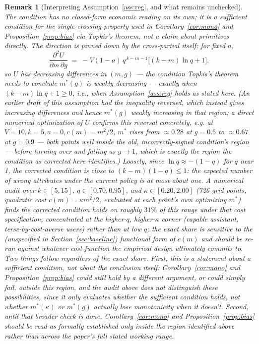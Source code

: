 \documentclass[11pt]{article}
\newtheorem{remark}{Remark}
\begin{document}
\begin{remark}[Interpreting Assumption~\ref{ass:reg}, and what remains unchecked]
\label{rmk:assumption1-audit}
The condition has no closed-form economic reading on its own; it is a sufficient
condition for the single-crossing property used in Corollary~\ref{cor:mono} and
Proposition~\ref{prop:bias} via Topkis's theorem, not a claim about primitives
directly. The direction is pinned down by the cross-partial itself: for fixed $a$,
\[
\frac{\partial^2 U}{\partial m\,\partial g} \;=\; -V(1-a)\,q^{\,k-m-1}\Big[(k-m)\ln q + 1\Big],
\]
so $U$ has \emph{decreasing differences} in $(m,g)$ --- the condition Topkis's
theorem needs to conclude $m^*(g)$ is weakly decreasing --- exactly when
$(k-m)\ln q + 1 \ge 0$, i.e., when Assumption~\ref{ass:reg} holds as stated here.
(An earlier draft of this assumption had the inequality reversed, which instead
gives \emph{increasing} differences and hence $m^*(g)$ weakly \emph{increasing}
in that region; a direct numerical optimization of $U$ confirms this reversal
concretely, e.g. at $V{=}10,k{=}5,a{=}0,c(m){=}m^2/2$, $m^*$ rises from
$\approx0.28$ at $g{=}0.5$ to $\approx0.67$ at $g{=}0.9$ --- both points well
inside the old, incorrectly-signed condition's region --- before turning over and
falling as $g\to1$, which is exactly the region the condition as corrected here
identifies.) Loosely, since $\ln q \approx -(1-q)$ for $q$ near 1, the corrected
condition is close to $(k-m)(1-q) \le 1$: the expected number of \emph{wrong}
attributes under the current policy is at most about one. A numerical audit over
$k\in[5,15]$, $q\in[0.70,0.95]$, and $\kappa\in[0.20,2.00]$ (726 grid points,
quadratic cost $c(m)=\kappa m^2/2$, evaluated at each point's own optimizing
$m^*$) finds the corrected condition holds on roughly $31\%$ of this range under
that cost specification, concentrated at the higher-$q$, higher-$\kappa$ corner
(capable assistant, terse-by-cost-averse users) rather than at low $q$; the exact
share is sensitive to the (unspecified in Section~\ref{sec:baseline}) functional
form of $c(m)$ and should be re-run against whatever cost function the empirical
design ultimately commits to. Two things follow regardless of the exact share.
First, this is a statement about a \emph{sufficient} condition, not about the
conclusion itself: Corollary~\ref{cor:mono} and Proposition~\ref{prop:bias} could
still hold by a different argument, or could simply fail, outside this region,
and the audit above does not distinguish these possibilities, since it only
evaluates whether the sufficient condition holds, not whether $m^*(\kappa)$ or
$m^*(g)$ actually lose monotonicity when it doesn't. Second, until that broader
check is done, Corollary~\ref{cor:mono} and Proposition~\ref{prop:bias} should be
read as formally established only inside the region identified above rather than
across the paper's full stated working range.
\end{remark}
\end{document}
